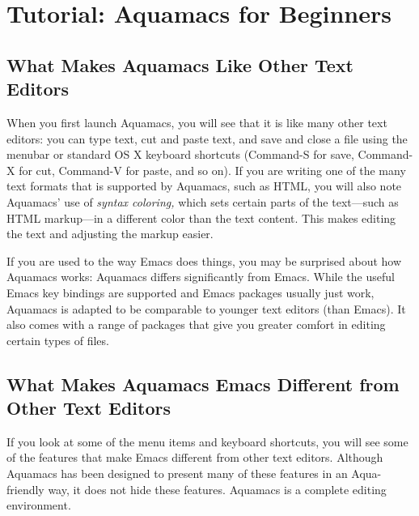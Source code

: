 \documentclass[11pt,letterpaper]{article}
\begin{document}
\section{Tutorial: Aquamacs for Beginners}

\subsection{What Makes Aquamacs Like Other Text Editors} 
When you first launch Aquamacs, you will see that it is like many other text editors: you can type text, cut and paste text, and save and close a file using the menubar or standard OS X keyboard shortcuts (Command-S for save, Command-X for cut, Command-V for paste, and so on). If you are writing one of the many text formats that is supported by Aquamacs, such as HTML, you will also note Aquamacs' use of \textit{syntax coloring,} which sets certain parts of the text---such as HTML markup---in a different color than the text content. This makes editing the text and adjusting the markup easier.

If you are used to the way Emacs does things, you may be surprised about how Aquamacs works:  Aquamacs differs significantly from Emacs.  While the useful Emacs key bindings are supported and Emacs packages usually just work, Aquamacs is adapted to be comparable to younger text editors (than Emacs).  It also comes with a range of packages that give you greater comfort in editing certain types of files.
 

\subsection{What Makes Aquamacs Emacs Different from Other Text
  Editors} If you look at some of the menu items and keyboard shortcuts, you will see some of the features that make Emacs different from other text editors. Although Aquamacs has been designed to present many of these features in an Aqua-friendly way, it does not hide these features. Aquamacs is a complete editing environment.
\end{document}

